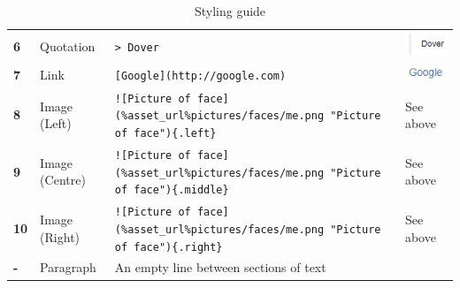 \documentclass[12pt]{article}
\newcommand{\marker}[1]{\color{red}\textbf{#1}\color{black}}
\begin{document}
\begin{landscape}
\begin{table}[h]
\begin{tabular}{llll}
\marker{6}    & Quotation      & \texttt{\textgreater\ Dover}                                                                                                                                               &   \includegraphics[scale=0.8]{pics/quote.png}  \\
\marker{7}    & Link           & \texttt{{[}Google{]}(http://google.com)}                                                                                                                                  &     \includegraphics[scale=0.8]{pics/link.png}             \\
\marker{8}    & Image (Left)   & \texttt{!{[}Picture of face{]}(\%asset\_url\%pictures/faces/me.png "Picture of face")\{.left\}} & See above \\
\marker{9}    & Image (Centre) & \texttt{!{[}Picture of face{]}(\%asset\_url\%pictures/faces/me.png "Picture of face")\{.middle\}}                                             &  See above \\
\marker{10}   & Image (Right)  & \texttt{!{[}Picture of face{]}(\%asset\_url\%pictures/faces/me.png "Picture of face")\{.right\}}                                              & See above \\
\marker{-}   & Paragraph      & An empty line between sections of text                                                                                                                           &                 
\end{tabular}
\caption{Styling guide}
\label{tbl:markdown}
\end{table}
\end{landscape}
\end{document}
